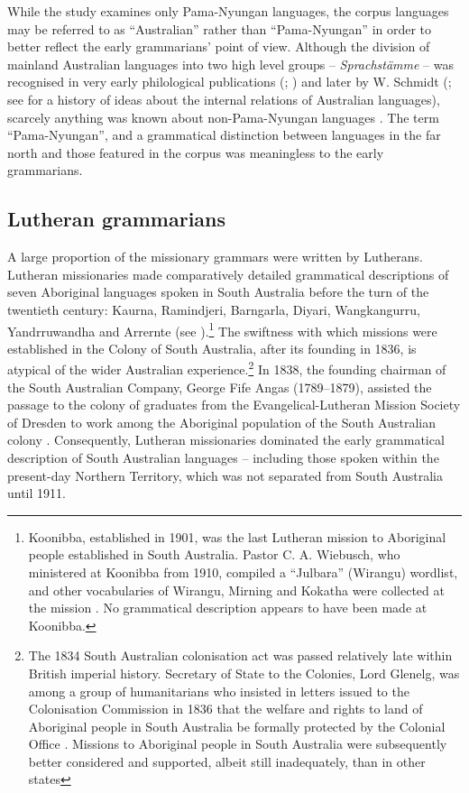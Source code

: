 While the study examines only Pama-Nyungan languages, the corpus languages may be referred to as ``Australian'' rather than ``Pama-Nyungan'' in order to better reflect the early grammarians’ point of view. Although the division of mainland Australian languages into two high level groups – \textit{Sprachstämme} – was recognised in very early philological publications (\citealt{bleek_library_1858}; \citealt[241]{muller_reise_1867}) and later by W. Schmidt (\citeyear{schmidt_personalpronomina_1919}; see \citealt{koch_historical_2014} for a history of ideas about the internal relations of Australian languages), scarcely anything was known about non-Pama-Nyungan languages \citep{Stockigt2021a,Stockigtinpress}. The term ``Pama-Nyungan'', and a grammatical distinction between languages in the far north and those featured in the corpus was meaningless to the early grammarians.

\subsection{Lutheran grammarians}
\label{sec:key:1.1.2}

A large proportion of the missionary grammars were written by Lutherans. Lutheran missionaries made comparatively detailed grammatical descriptions of seven Aboriginal languages spoken in South Australia before the turn of the twentieth century: Kaurna, Ramindjeri, Barngarla, Diyari, Wangkangurru, Yandrruwandha and Arrernte (see ).\footnote{Koonibba, established in 1901, was the last Lutheran mission to Aboriginal people established in South Australia. Pastor C. A. Wiebusch, who ministered at Koonibba from 1910, compiled a “Julbara” (Wirangu) wordlist, and other vocabularies of Wirangu, Mirning and Kokatha were collected at the mission \citep{hoff_hoff_2004}. No grammatical description appears to have been made at Koonibba.}  The swiftness with which missions were established in the Colony of South Australia, after its founding in 1836, is atypical of the wider Australian experience.\footnote{The 1834 South Australian colonisation act was passed relatively late within British imperial history. Secretary of State to the Colonies, Lord Glenelg, was among a group of humanitarians who insisted in letters issued to the Colonisation Commission in 1836 that the welfare and rights to land of Aboriginal people in South Australia be formally protected by the Colonial Office \citep[94--102]{reynolds_law_1987}. Missions to Aboriginal people in South Australia were subsequently better considered and supported, albeit still inadequately, than in other states} In 1838, the founding chairman of the South Australian Company, George Fife Angas (1789--1879), assisted the passage to the colony of graduates from the Evangelical-Lutheran Mission Society of Dresden to work among the Aboriginal population of the South Australian colony \citep[61--65]{lockwood_two_2014}. Consequently, Lutheran missionaries dominated the early grammatical description of South Australian languages – including those spoken within the present-day Northern Territory, which was not separated from South Australia until 1911.

